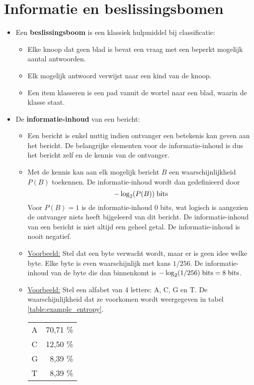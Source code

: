 \documentclass{report}
\begin{document}
\section{Informatie en beslissingsbomen}
\begin{itemize}
	\item Een \textbf{beslissingsboom} is een klassiek hulpmiddel bij classificatie:
	\begin{itemize}
		\item Elke knoop dat geen blad is bevat een vraag met een beperkt mogelijk aantal antwoorden.
		\item Elk mogelijk antwoord verwijst naar een kind van de knoop.
		\item Een item klasseren is een pad vanuit de wortel naar een blad, waarin de klasse staat.
	\end{itemize}
	\item De \textbf{informatie-inhoud} van een bericht:
	\begin{itemize}
		\item Een bericht is enkel nuttig indien ontvanger een betekenis kan geven aan het bericht. De belangrijke elementen voor de informatie-inhoud is dus het bericht zelf en de kennis van de ontvanger.
		\item Met de kennis kan aan elk mogelijk bericht $B$ een waarschijnlijkheid $P(B)$ toekennen. De informatie-inhoud wordt dan gedefinieerd door
		$$-\log_2(P(B))\; \hbox{bits}$$ 
		Voor $P(B) = 1$ is de informatie-inhoud 0 bits, wat logisch is aangezien de ontvanger niets heeft bijgeleerd van dit bericht.
		\alert De informatie-inhoud van een bericht is niet altijd een geheel getal.
		\alert De informatie-inhoud is nooit negatief.
		\item \underline{Voorbeeld:} Stel dat een byte verwacht wordt, maar er is geen idee welke byte. Elke byte is even waarschijnlijk met kans $1/256$. De informatie-inhoud van de byte die dan binnenkomt is $-\log_2 (1/256)\;\hbox{bits} = 8 \;\hbox{bits}$.
		\item \underline{Voorbeeld:} Stel een alfabet van 4 letters: A, C, G en T. De waarschijnlijkheid dat ze voorkomen wordt weergegeven in tabel \ref{table:example_entropy}.
		\begin{table}[h]
			\centering
			\begin{tabular}{l | r}
				A & 70,71 \% \\
				C & 12,50 \% \\
				G &  8,39 \% \\
				T & 8,39 \% \\

\end{tabular}
\end{table}
\end{itemize}
\end{itemize}
\end{document}
